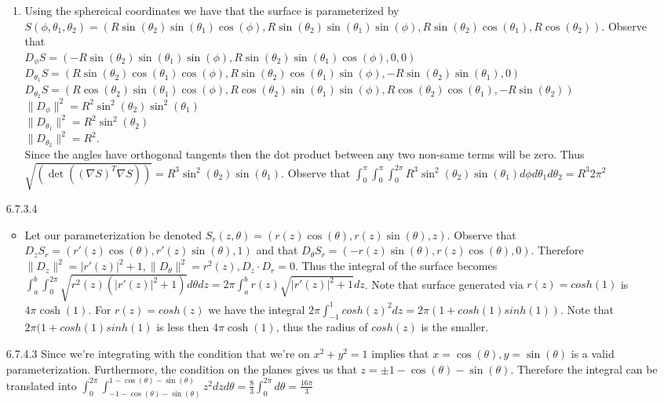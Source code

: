 \documentclass[12pt, letterpaper]{article}
\begin{document}
\begin{enumerate}
\begin{enumerate}
		\item Using the sphereical coordinates we have 
		that the surface  is parameterized by 
		$S(\phi, \theta_1,\theta_2) = 
		(R\sin(\theta_2) \sin(\theta_1) \cos(\phi),
		R \sin(\theta_2) \sin(\theta_1) \sin(\phi),
		R \sin(\theta_2) \cos(\theta_1),
		R \cos(\theta_2)		
		)$.  Observe that \\
		$D_\phi S = (-R\sin(\theta_2) \sin(\theta_1) \sin(\phi),
		R \sin(\theta_2) \sin(\theta_1) \cos(\phi),
		0,
		0
		)$\\
		$D_{\theta_1} S = 
		(R\sin(\theta_2) \cos(\theta_1) \cos(\phi),
		R \sin(\theta_2) \cos(\theta_1) \sin(\phi),
		-R \sin(\theta_2) \sin(\theta_1),
		0
		)$\\
		$D_{\theta_2} S = (R\cos(\theta_2) \sin(\theta_1) \cos(\phi),
		R \cos(\theta_2) \sin(\theta_1) \sin(\phi),
		R \cos(\theta_2) \cos(\theta_1),
		-R \sin(\theta_2)		
		)$
		$\|D_{\phi}\|^2 = R^2 \sin^2(\theta_2)\sin^2(\theta_1)$\\
		$\|D_{\theta_1}\|^2 = R^2\sin^2(\theta_2)$\\
		$\|D_{\theta_2}\|^2 = R^2$.\\
		Since the angles have orthogonal tangents then the 
		dot product between any two non-same terms will be zero.
		Thus $\sqrt{(\det((\nabla S)^T \nabla S))} = 
		R^3 \sin^2(\theta_2)\sin(\theta_1)$.  Observe that 
		$\int_0^\pi \int_0^\pi \int_0^{2\pi} R^3 \sin^2(\theta_2)\sin(\theta_1) d \phi d \theta_1 d \theta_2 = R^3 2 \pi^2$
	\end{enumerate}
	
	\item[6.7.3.4] 
	\begin{itemize}
		\item Let our parameterization 
		be denoted $S_r(z,\theta) = (r(z)\cos(\theta),
		r(z)\sin(\theta),z)$.  
		Observe that 
		$D_z S_r = (r'(z)\cos(\theta), r'(z) \sin(\theta),1)$ and that $D_\theta S_r = 
		(-r(z)\sin(\theta), r(z) \cos(\theta), 0)$.
		Therefore 
		$\| D_z\|^2 = |r'(z)|^2 + 1, \| D_\theta\|^2 = 
		r^2(z), D_z \cdot D_r = 0$.  Thus the 
		integral of the surface becomes 
		$\int_a^b \int_0^{2 \pi} \sqrt{r^2(z)(|r'(z)|^2 + 1)}d\theta dz = 2 \pi \int_a^b r(z) \sqrt{|r'(z)|^2 + 1}dz $.
		Note that surface generated via $r(z) =cosh(1)$ 
		is $4 \pi \cosh(1)$.  For $r(z) = cosh(z)$ we 
		have the integral 
		$2 \pi \int_{-1}^1 cosh(z)^2 dz = 2 \pi(1+cosh(1)sinh(1))$.  Note that $2 \pi(1+cosh(1)sinh(1)$
		is less then $4 \pi \cosh(1)$, thus the radius 
		of $cosh(z)$ is the smaller.  
	\end{itemize}
	\item[6.7.4.3] Since we're integrating with the condition 
	that we're on $x^2 + y^2 = 1$ implies that 
	$x = \cos(\theta), y = \sin(\theta)$ is a valid 
	parameterization.  Furthermore, the condition on the 
	planes gives us that $z = \pm1 - \cos(\theta) - \sin(\theta)$.
	Therefore the integral can be translated into 
	$\int_0^{2\pi} \int_{-1-\cos(\theta) - \sin(\theta)}^{1-\cos(\theta) - \sin(\theta)} z^2 dz d \theta = 
	\frac{8}{3}\int_0^{2 \pi} d \theta = \frac{16\pi}{3}$ \\
	
	
\end{enumerate}
\end{document}
